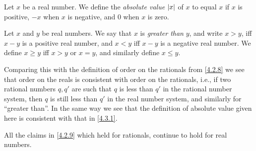 \begin{definition}\label{5.4.5}
  Let \(x\) be a real number.
  We define the \emph{absolute value} \(\left\lvert x\right\rvert\) of \(x\) to equal \(x\) if \(x\) is positive, \(-x\) when \(x\) is negative, and \(0\) when \(x\) is zero.
\end{definition}

\begin{definition}\label{5.4.6}
  Let \(x\) and \(y\) be real numbers.
  We say that \(x\) is \emph{greater than} \(y\), and write \(x > y\), iff \(x - y\) is a positive real number, and \(x < y\) iff \(x - y\) is a negative real number.
  We define \(x \geq y\) iff \(x > y\) or \(x = y\), and similarly define \(x \leq y\).
\end{definition}

\begin{note}
  Comparing this with the definition of order on the rationals from \cref{4.2.8} we see that order on the reals is consistent with order on the rationals, i.e., if two rational numbers \(q, q'\) are such that \(q\) is less than \(q'\) in the rational number system, then \(q\) is still less than \(q'\) in the real number system, and similarly for ``greater than''.
  In the same way we see that the definition of absolute value given here is consistent with that in \cref{4.3.1}.
\end{note}

\begin{proposition}\label{5.4.7}
  All the claims in \cref{4.2.9} which held for rationals, continue to hold for real numbers.
\end{proposition}

